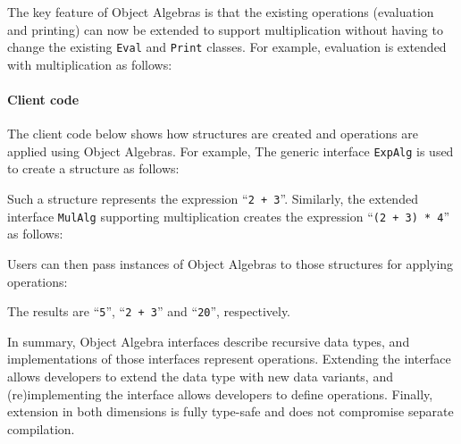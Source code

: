 
\noindent The key feature of Object Algebras is that the existing operations
(evaluation and printing) can now be extended to support
multiplication without having to change the existing \lstinline{Eval}
and \lstinline{Print} classes. For example, evaluation is extended
with multiplication as follows:


\paragraph{Client code}
The client code below shows how structures are created and operations are applied using
Object Algebras. For example, The generic interface \lstinline{ExpAlg} is used to create a structure as follows:


\noindent Such a structure represents the expression ``\lstinline{2 + 3}''. Similarly, the extended interface \lstinline{MulAlg} supporting multiplication
creates the expression ``\lstinline{(2 + 3)}\lstinline{ * 4}'' as follows:


\noindent Users can then pass instances of Object Algebras to those structures for applying operations: 


\noindent The results are ``\lstinline{5}'', ``\lstinline{2 + 3}'' and ``\lstinline{20}'', respectively.

In summary, Object Algebra interfaces describe recursive data types,
and implementations of those interfaces represent
operations. Extending the interface allows developers to extend the
data type with new data variants, and (re)implementing the interface
allows developers to define operations.  Finally, extension in both
dimensions is fully type-safe and does not compromise separate
compilation.

